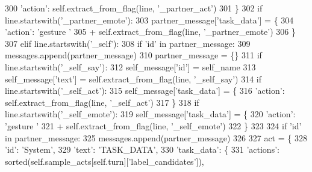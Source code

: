 \begin{DoxyCode}
300                         \textcolor{stringliteral}{'action'}: self.extract\_from\_flag(line, \textcolor{stringliteral}{'\_partner\_act'})
301                     \}
302                 \textcolor{keywordflow}{if} line.startswith(\textcolor{stringliteral}{'\_partner\_emote'}):
303                     partner\_message[\textcolor{stringliteral}{'task\_data'}] = \{
304                         \textcolor{stringliteral}{'action'}: \textcolor{stringliteral}{'gesture '}
305                         + self.extract\_from\_flag(line, \textcolor{stringliteral}{'\_partner\_emote'})
306                     \}
307             \textcolor{keywordflow}{elif} line.startswith(\textcolor{stringliteral}{'\_self'}):
308                 \textcolor{keywordflow}{if} \textcolor{stringliteral}{'id'} \textcolor{keywordflow}{in} partner\_message:
309                     messages.append(partner\_message)
310                     partner\_message = \{\}
311                 \textcolor{keywordflow}{if} line.startswith(\textcolor{stringliteral}{'\_self\_say'}):
312                     self\_message[\textcolor{stringliteral}{'id'}] = self\_name
313                     self\_message[\textcolor{stringliteral}{'text'}] = self.extract\_from\_flag(line, \textcolor{stringliteral}{'\_self\_say'})
314                 \textcolor{keywordflow}{if} line.startswith(\textcolor{stringliteral}{'\_self\_act'}):
315                     self\_message[\textcolor{stringliteral}{'task\_data'}] = \{
316                         \textcolor{stringliteral}{'action'}: self.extract\_from\_flag(line, \textcolor{stringliteral}{'\_self\_act'})
317                     \}
318                 \textcolor{keywordflow}{if} line.startswith(\textcolor{stringliteral}{'\_self\_emote'}):
319                     self\_message[\textcolor{stringliteral}{'task\_data'}] = \{
320                         \textcolor{stringliteral}{'action'}: \textcolor{stringliteral}{'gesture '}
321                         + self.extract\_from\_flag(line, \textcolor{stringliteral}{'\_self\_emote'})
322                     \}
323 
324         \textcolor{keywordflow}{if} \textcolor{stringliteral}{'id'} \textcolor{keywordflow}{in} partner\_message:
325             messages.append(partner\_message)
326 
327         act = \{
328             \textcolor{stringliteral}{'id'}: \textcolor{stringliteral}{'System'},
329             \textcolor{stringliteral}{'text'}: \textcolor{stringliteral}{'TASK\_DATA'},
330             \textcolor{stringliteral}{'task\_data'}: \{
331                 \textcolor{stringliteral}{'actions'}: sorted(self.sample\_acts[self.turn][\textcolor{stringliteral}{'label\_candidates'}]),

\end{DoxyCode}
